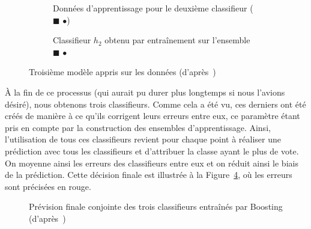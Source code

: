 \begin{figure}[h]
	\begin{margincap}
	\begin{subfigure}{.45\textwidth}
		
		\caption{Données d'apprentissage pour le deuxième classifieur ($\blacksquare$ \large{$\bullet$})}
		\label{fig:boosting_trois_app}
	\end{subfigure}\hfill
	\begin{subfigure}{.45\textwidth}
		
		\caption{Classifieur $h_2$ obtenu par entraînement sur l'ensemble $\blacksquare$ \large{$\bullet$}}
		\label{fig:boosting_trois_modele}
	\end{subfigure}\hfill
		\caption{Troisième modèle appris sur les données (d'après~\cite{bib:elghazel})}
	\end{margincap}
\end{figure}

À la fin de ce processus (qui aurait pu durer plus longtemps si nous l'avions désiré), nous obtenons trois classifieurs. Comme cela a été vu, ces derniers ont été créés de manière à ce qu'ils corrigent leurs erreurs entre eux, ce paramètre étant pris en compte par la construction des ensembles d'apprentissage. Ainsi, l'utilisation de tous ces classifieurs revient pour chaque point à réaliser une prédiction avec tous les classifieurs et d'attribuer la classe ayant le plus de vote. On moyenne ainsi les erreurs des classifieurs entre eux et on réduit ainsi le biais de la prédiction. Cette décision finale est illustrée à la Figure~\ref{fig:boosting_final}, où les erreurs sont précisées en rouge.

\begin{figure}[h]
	\begin{margincap}
	\centering
	
	\caption{Prévision finale conjointe des trois classifieurs entraînés par Boosting (d'après~\cite{bib:elghazel})}
	\label{fig:boosting_final}
	\end{margincap}
\end{figure}


